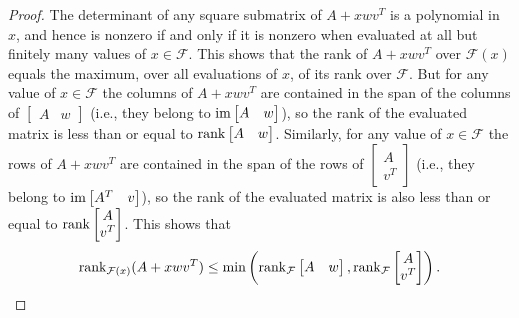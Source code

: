 \documentclass{amsart}
\theoremstyle{definition}
\begin{document}
\begin{proof}
The determinant of any square submatrix of $A + xwv^T$ is a polynomial in $x$, and hence is nonzero if and only if it is nonzero when evaluated at all but finitely many values of $x \in \mathcal{F}$. This shows that the rank of $A + xwv^T$ over $\mathcal{F}(x)$ equals the maximum, over all evaluations of $x$, of its rank over $\mathcal{F}$. But for any value of $x \in \mathcal{F}$ the columns of $A + xwv^T$ are contained in the span of the columns of $\left[\begin{matrix} A&w\end{matrix}\right]$ (i.e., they belong to ${\rm im}\left[\begin{matrix} A&w\end{matrix}\right]$), so the rank of the evaluated matrix is less than or equal to ${\rm rank}\left[\begin{matrix} A&w\end{matrix}\right]$. Similarly, for any value of $x \in \mathcal{F}$ the rows of $A + xwv^T$ are contained in the span of the rows of $\left[\begin{matrix} A\\v^T\end{matrix}\right]$ (i.e., they belong to ${\rm im} \left[\begin{matrix} A^T & v\end{matrix}\right]$), so the rank of the evaluated matrix is also less than or equal to ${\rm rank}\left[\begin{matrix} A\\ v^T\end{matrix}\right]$. This shows that $${\rm rank}_{\mathcal{F}(x)}(A + xwv^T) \leq {\rm min}\left({\rm rank}_\mathcal{F}\left[\begin{matrix} A&w\end{matrix}\right], {\rm rank}_{\mathcal{F}}\left[\begin{matrix} A\\ v^T\end{matrix}\right]\right).$$


\end{proof}
\end{document}
